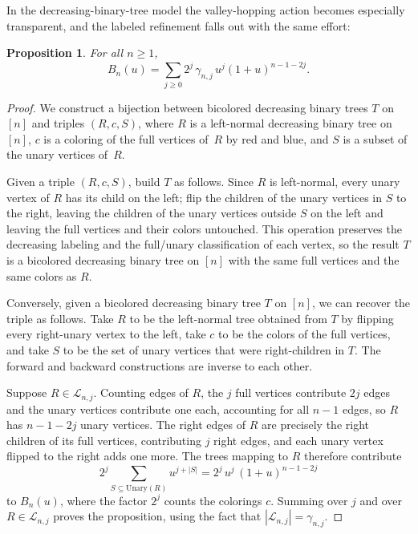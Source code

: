 \documentclass[10pt]{article}
\theoremstyle{plain}
\newtheorem{proposition}[theorem]{Proposition}
\begin{document}
In the decreasing-binary-tree model the valley-hopping action becomes especially transparent, and the labeled refinement falls out with the same effort:

\begin{proposition}
\label{prp:foata-strehl}
For all $n \geq 1$,
\[
	B_n(u) = \sum_{j \geq 0} 2^j\, \gamma_{n,j}\, u^j (1+u)^{n-1-2j}.
\]
\end{proposition}

\begin{proof}
We construct a bijection between bicolored decreasing binary trees $T$ on $[n]$ and triples $(R, c, S)$, where $R$ is a left-normal decreasing binary tree on $[n]$, $c$ is a coloring of the full vertices of~$R$ by red and blue, and $S$ is a subset of the unary vertices of~$R$.

Given a triple $(R, c, S)$, build $T$ as follows. Since $R$ is left-normal, every unary vertex of $R$ has its child on the left; flip the children of the unary vertices in $S$ to the right, leaving the children of the unary vertices outside $S$ on the left and leaving the full vertices and their colors untouched. This operation preserves the decreasing labeling and the full/unary classification of each vertex, so the result $T$ is a bicolored decreasing binary tree on $[n]$ with the same full vertices and the same colors as $R$.

Conversely, given a bicolored decreasing binary tree $T$ on $[n]$, we can recover the triple as follows. Take $R$ to be the left-normal tree obtained from $T$ by flipping every right-unary vertex to the left, take $c$ to be the colors of the full vertices, and take $S$ to be the set of unary vertices that were right-children in $T$. The forward and backward constructions are inverse to each other.

Suppose $R \in \mathcal{L}_{n,j}$. Counting edges of $R$, the $j$ full vertices contribute $2j$ edges and the unary vertices contribute one each, accounting for all $n-1$ edges, so $R$ has $n - 1 - 2j$ unary vertices. The right edges of $R$ are precisely the right children of its full vertices, contributing $j$ right edges, and each unary vertex flipped to the right adds one more. The trees mapping to $R$ therefore contribute
\[
	2^j \sum_{S \subseteq \mathrm{Unary}(R)} u^{j + |S|} = 2^j\, u^j\, (1+u)^{n-1-2j}
\]
to $B_n(u)$, where the factor $2^j$ counts the colorings $c$. Summing over $j$ and over $R \in \mathcal{L}_{n,j}$ proves the proposition, using the fact that $|\mathcal{L}_{n,j}| = \gamma_{n,j}$.
\end{proof}
\end{document}

